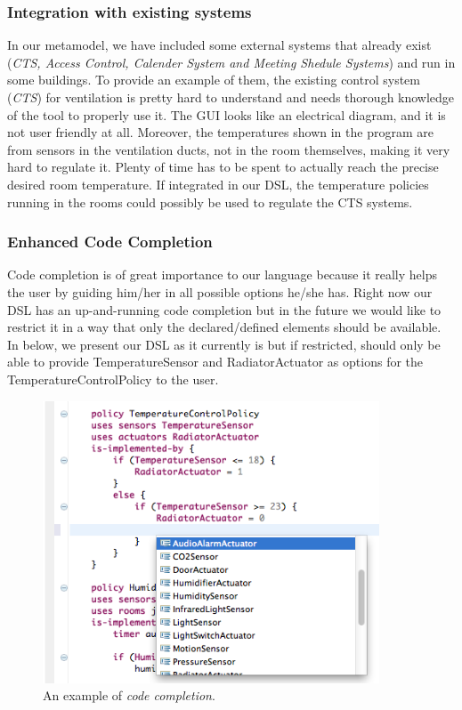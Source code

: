 \documentclass{llncs}
\begin{document}
\subsubsection{Integration with existing systems}\label{subsec:integration}
In our metamodel, we have included some external systems that already exist (\textit{CTS, Access Control, Calender System and Meeting Shedule Systems}) and run in some buildings. To provide an example of them, the existing control system (\textit{CTS}) for ventilation is pretty hard to understand and needs thorough knowledge of the tool to properly use it. The GUI looks like an electrical diagram, and it is not user friendly at all. Moreover, the temperatures shown in the program are from sensors in the ventilation ducts, not in the room themselves, making it very hard to regulate it. Plenty of time has to be spent to actually reach the precise desired room temperature. If integrated in our DSL, the temperature policies running in the rooms could possibly be used to regulate the CTS systems.

\subsubsection{Enhanced Code Completion}\label{subsec:codecompletion}
Code completion is of great importance to our language because it really helps the user by guiding him/her in all possible options he/she has. Right now our DSL has an up-and-running code completion but in the future we would like to restrict it in a way that only the declared/defined elements should be available. In  below, we present our DSL as it currently is but if restricted, should only be able to provide TemperatureSensor and RadiatorActuator as options for the TemperatureControlPolicy to the user.

\begin{figure}
  \centering
    \includegraphics[width=10cm]{dsl-code-completion.png} 
	\caption{An example of \textit{code completion}.}
	\label{fig:code-completion}
\end{figure}
\end{document}
